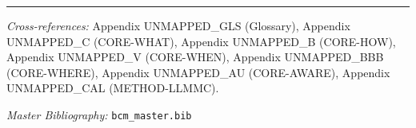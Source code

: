 \nocite{bcm_master}


\vspace{1em}
\hrule
\vspace{0.5em}

\noindent\textit{Cross-references:}
Appendix UNMAPPED_GLS (Glossary),
Appendix UNMAPPED_C (CORE-WHAT),
Appendix UNMAPPED_B (CORE-HOW),
Appendix UNMAPPED_V (CORE-WHEN),
Appendix UNMAPPED_BBB (CORE-WHERE),
Appendix UNMAPPED_AU (CORE-AWARE),
Appendix UNMAPPED_CAL (METHOD-LLMMC).

\noindent\textit{Master Bibliography:} \texttt{bcm\_master.bib}

